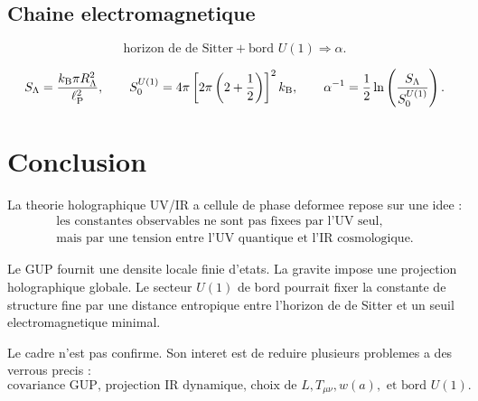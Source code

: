 \documentclass[11pt,a4paper]{article}
\newcommand{\lp}{\ell_{\rm P}}
\newcommand{\RL}{R_\Lambda}
\newcommand{\kb}{k_{\rm B}}
\begin{document}
\subsection{Chaine electromagnetique}

\begin{equation}
\boxed{
\text{horizon de de Sitter}+\text{bord }U(1)
\Rightarrow \alpha.
}
\end{equation}

\begin{equation}
S_\Lambda=\frac{\kb\pi\RL^2}{\lp^2},
\qquad
S_0^{U(1)}=4\pi\left[2\pi\left(2+\frac12\right)\right]^2\kb,
\qquad
\alpha^{-1}=\frac12\ln\left(\frac{S_\Lambda}{S_0^{U(1)}}\right).
\end{equation}

\section{Conclusion}

La theorie holographique UV/IR a cellule de phase deformee repose sur une idee :
\begin{equation}
\boxed{
\begin{gathered}
\text{les constantes observables ne sont pas fixees par l'UV seul,}\\
\text{mais par une tension entre l'UV quantique et l'IR cosmologique.}
\end{gathered}
}
\end{equation}

Le GUP fournit une densite locale finie d'etats. La gravite impose une
projection holographique globale. Le secteur \(U(1)\) de bord pourrait fixer
la constante de structure fine par une distance entropique entre l'horizon de
de Sitter et un seuil electromagnetique minimal.

Le cadre n'est pas confirme. Son interet est de reduire plusieurs problemes a
des verrous precis :
\begin{equation}
\boxed{
\text{covariance GUP, projection IR dynamique, choix de }L, T_{\mu\nu}, w(a),
\text{ et bord }U(1).
}
\end{equation}
\end{document}
